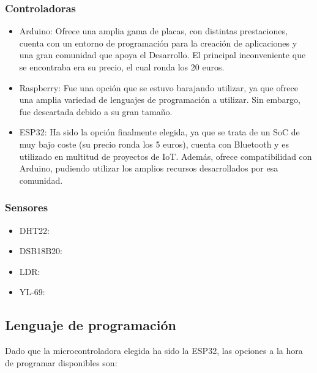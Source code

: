 \documentclass[runningheads]{llncs}
\begin{document}
\subsubsection*{Controladoras}
\begin{itemize}
    \item Arduino: Ofrece una amplia gama de placas, con distintas prestaciones, cuenta con un entorno de programación para la creación de aplicaciones y una gran comunidad que apoya el Desarrollo. El principal inconveniente que se encontraba era su precio, el cual ronda los 20 euros.
    
    \item Raspberry: Fue una opción que se estuvo barajando utilizar, ya que ofrece una amplia variedad de lenguajes de programación a utilizar. Sin embargo, fue descartada debido a su gran tamaño.
    
    \item ESP32: Ha sido la opción finalmente elegida, ya que se trata de un SoC de muy bajo coste (su precio ronda los 5 euros), cuenta con Bluetooth y es utilizado en multitud de proyectos de IoT. Además, ofrece compatibilidad con Arduino, pudiendo utilizar los amplios recursos desarrollados por esa comunidad.
\end{itemize}

\subsubsection*{Sensores}
\begin{itemize}
    \item DHT22:
    \item DSB18B20:
    \item LDR:
    \item YL-69:
\end{itemize}

\subsection*{Lenguaje de programación}

Dado que la microcontroladora elegida ha sido la ESP32, las opciones a la hora de programar disponibles son:
\end{document}
